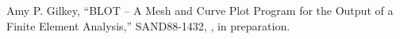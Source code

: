 Amy P. Gilkey,
``BLOT -- A Mesh and Curve Plot Program
for the Output of a Finite Element Analysis,''
SAND88-1432, \SNLA, in preparation.
